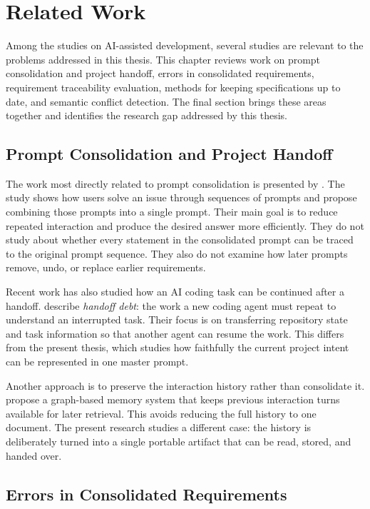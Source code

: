 \chapter{Related Work}
\label{chap:related-work}

Among the studies on AI-assisted development, several studies
are relevant to the problems addressed in this thesis. This chapter
reviews work on prompt consolidation and project handoff, errors in consolidated
requirements, requirement traceability evaluation, methods for keeping
specifications up to date, and semantic conflict detection. The final section
brings these areas together and identifies the research gap addressed by this
thesis.

\section{Prompt Consolidation and Project Handoff}
\label{sec:related-consolidating}

The work most directly related to prompt consolidation is presented by
\citet{mondal2024consolidating}. The study shows how users solve an issue through
sequences of prompts and propose combining those prompts into a single prompt.
Their main goal is to reduce repeated interaction and produce the desired
answer more efficiently. They do not study about whether every statement in the
consolidated prompt can be traced to the original prompt sequence. They also
do not examine how later prompts remove, undo, or replace earlier
requirements.

Recent work has also studied how an AI coding task can be continued after a
handoff. \citet{kc2026handoffdebt} describe \emph{handoff debt}: the work a
new coding agent must repeat to understand an interrupted task. Their focus is
on transferring repository state and task information so that another agent
can resume the work. This differs from the present thesis, which studies how
faithfully the current project intent can be represented in one master
prompt.

Another approach is to preserve the interaction history rather than
consolidate it. \citet{santoni2026cmv} propose a graph-based memory system that
keeps previous interaction turns available for later retrieval. This avoids
reducing the full history to one document. The present research studies a
different case: the history is deliberately turned into a single portable
artifact that can be read, stored, and handed over.

\section{Errors in Consolidated Requirements}
\label{sec:related-loss}

